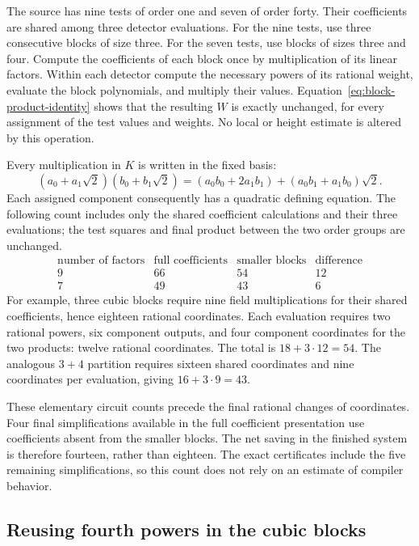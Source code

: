 \documentclass[11pt,a4paper]{article}
\theoremstyle{definition}
\theoremstyle{remark}
\begin{document}
The source has nine tests of order one and seven of order forty.
Their coefficients are shared among three detector evaluations.
For the nine tests, use three consecutive blocks of size three.
For the seven tests, use blocks of sizes three and four.
Compute the coefficients of each block once by multiplication of
its linear factors. Within each detector compute the necessary
powers of its rational weight, evaluate the block polynomials, and
multiply their values. Equation~\eqref{eq:block-product-identity}
shows that the resulting $W$ is exactly unchanged, for every
assignment of the test values and weights. No local or height
estimate is altered by this operation.

Every multiplication in $K$ is written in the fixed basis:
\[
 (a_0+a_1\sqrt2)(b_0+b_1\sqrt2)
 =(a_0b_0+2a_1b_1)+(a_0b_1+a_1b_0)\sqrt2.
\]
Each assigned component consequently has a quadratic defining
equation. The following count includes only the shared coefficient
calculations and their three evaluations; the test squares and final
product between the two order groups are unchanged.
\[
\begin{array}{c|rr|r}
\text{number of factors}&\text{full coefficients}&\text{smaller blocks}
   &\text{difference}\\\hline
9&66&54&12\\
7&49&43&6
\end{array}
\]
For example, three cubic blocks require nine field multiplications
for their shared coefficients, hence eighteen rational coordinates.
Each evaluation requires two rational powers, six component outputs,
and four component coordinates for the two products: twelve rational
coordinates. The total is $18+3\cdot12=54$.
The analogous $3+4$ partition requires sixteen shared coordinates
and nine coordinates per evaluation, giving $16+3\cdot9=43$.

These elementary circuit counts precede the final rational changes
of coordinates. Four final simplifications available in the full
coefficient presentation use coefficients absent from the smaller
blocks. The net saving in the finished system is therefore fourteen,
rather than eighteen. The exact certificates include the five
remaining simplifications, so this count does not rely on an estimate
of compiler behavior.

\subsection{Reusing fourth powers in the cubic blocks}
\end{document}
